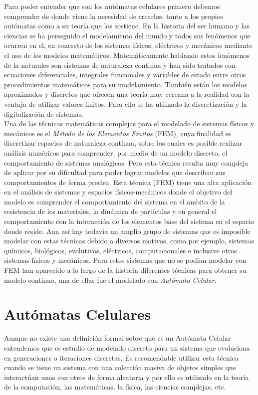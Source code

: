 %

Para poder entender que son los autómatas celulares primero debemos comprender de donde viene la necesidad de crearlos, tanto a los propios autómatas como a su teoría que los sostiene. En la historia del ser humano y las ciencias se ha perseguido el modelamiento del mundo y todos sus fenómenos que ocurren en el, en concreto de los sistemas físicos, eléctricos y mecánicos mediante el uso de los modelos matemáticos. Matemáticamente hablando estos fenómenos de la naturales son sistemas de naturaleza continua y han sido tratados con ecuaciones diferenciales, integrales funcionales y variables de estado entre otros procedimientos matemáticos para su modelamiento. También están los modelos aproximados y discretos que ofrecen una teoría muy cercana a la realidad con la ventaja de utilizar valores finitos. Para ello se ha utilizado la discretización y la digitalización de sistemas.\\

Una de las técnicas matemáticas complejas para el modelado de sistemas físicos y mecánicos es el \textit{Método de los Elementos Finitos} (FEM), cuya finalidad es discretizar espacios de naturaleza contínua, sobre los cuales es posible realizar análisis numéricos para comprender, por medio de un modelo discreto, el comportamiento de sistemas analógicos. Pero esta técnica resulta muy compleja de aplicar por su dificultad para poder lograr modelos que describan sus comportamientos de forma precisa. Esta técnica (FEM) tiene una alta aplicación en el análisis de sistemas y espacios físicos-mecánicos donde el objetivo del modelo es comprender el comportamiento del sistema en el ambito de la resistencia de los materiales, la dinámica de partículas y en general el comportamiento con la interacción  de los elementos base del sistema en el espacio donde reside.
Aun así hay todavía un amplio grupo de sistemas que es imposible modelar con estas técnicas debido a diversos motivos, como por ejemplo, sistemas químicos, biológicos, evolutivos, eléctricos, computacionales e inclusive otros sistemas físicos y mecánicos. Para estos sistemas que no se podían modelar con FEM han aparecido a lo largo de la historia diferentes técnicas para obtener su modelo continuo, una de ellas fue el modelado con \textit{Autómata Celular}.




\section{Autómatas Celulares}
Aunque no existe una definición formal sobre que es un Autómata Celular entendemos que es estudio de modelado discreto para un sistema que evoluciona en generaciones o iteraciones discretas. Es recomendable utilizar esta técnica cuando se tiene un sistema con una colección masiva de objetos simples que interactúan unos con otros de forma aleatoria y por ello es utilizado en la teoría de la computación, las matemáticas, la física, las ciencias complejas, etc. \\

